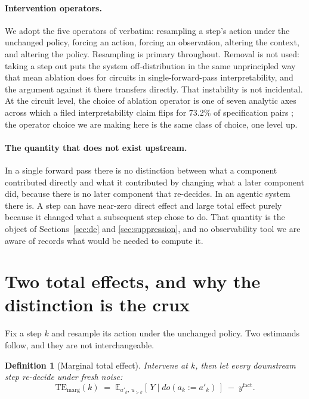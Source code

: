 \documentclass[11pt]{article}
\newtheorem{definition}{Definition}
\theoremstyle{remark}
\newcommand{\TEmarg}{\mathrm{TE}_{\mathrm{marg}}}
\newcommand{\Ex}{\mathbb{E}}
\begin{document}
\paragraph{Intervention operators.} We adopt the five operators of
\citet{car2026} verbatim: resampling a step's action under the unchanged policy,
forcing an action, forcing an observation, altering the context, and altering the
policy. Resampling is primary throughout. Removal is not used: taking a step out
puts the system off-distribution in the same unprincipled way that mean ablation
does for circuits in single-forward-pass interpretability, and the argument
against it there transfers directly. That instability is not incidental. At the
circuit level, the choice of ablation operator is one of seven analytic axes
across which a filed interpretability claim flips for 73.2\% of specification
pairs \citep{mahale2026multiplicity}; the operator choice we are making here is
the same class of choice, one level up.

\paragraph{The quantity that does not exist upstream.} In a single forward pass
there is no distinction between what a component contributed directly and what it
contributed by changing what a later component did, because there is no later
component that re-decides. In an agentic system there is. A step can have
near-zero direct effect and large total effect purely because it changed what a
subsequent step chose to do. That quantity is the object of
Sections~\ref{sec:de} and \ref{sec:suppression}, and no observability tool we are
aware of records what would be needed to compute it.

\section{Two total effects, and why the distinction is the crux}
\label{sec:two-te}

Fix a step $k$ and resample its action under the unchanged policy. Two estimands
follow, and they are not interchangeable.

\begin{definition}[Marginal total effect]
Intervene at $k$, then let every downstream step re-decide under \emph{fresh}
noise:
\[
  \TEmarg(k) \;=\; \Ex_{a'_k,\,u_{>k}}\!\left[\,Y \mid do(a_k := a'_k)\,\right]
              \;-\; y^{\mathrm{fact}} .
\]
\end{definition}
\end{document}
